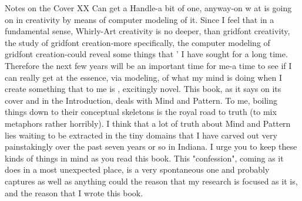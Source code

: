 


Notes on the Cover                                                                   XX Can get a Handle-a bit of one, anyway-on w at is going on in creativity by means of computer modeling of it. Since I feel that in a fundamental sense, Whirly-Art creativity is no deeper, than gridfont creativity, the study of gridfont creation-more specifically, the computer modeling of gridfont creation-could reveal some things that ' I have sought for a long time. Therefore the next few years will be an important time for me-a time to see if I can really get at the essence, via modeling, of what my mind is doing when I create something that to me is , excitingly novel. This book, as it says on its cover and in the Introduction, deals with Mind and Pattern. To me, boiling things down to their conceptual skeletons is the royal road to truth (to mix metaphors rather horribly). I think that a lot of truth about Mind and Pattern lies waiting to be extracted in the tiny domains that I have carved out very painstakingly over the past seven years or so in Indiana. I urge you to keep these kinds of things in mind as you read this book. This "confession", coming as it does in a most unexpected place, is a very spontaneous one and probably captures as well as anything could the reason that my research is focused as it is, and the reason that I wrote this book. 



